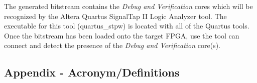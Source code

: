 \begin{flushleft}
		The generated bitstream contains the \textit{Debug and Verification} cores which will be recognized by the Altera Quartus SignalTap II Logic Analyzer tool. The executable for this tool (quartus\_stpw) is located with all of the Quartus tools. Once the bitstream has been loaded onto the target FPGA, use the tool can connect and detect the presence of the \textit{Debug and Verification} core(s).
\end{flushleft}


\newpage

\begin{appendices}
\appendix
\section{Appendix - Acronym/Definitions} \label{App:AppendixA}
\begin{flushleft}
\end{flushleft}
\newpage

\end{appendices}



